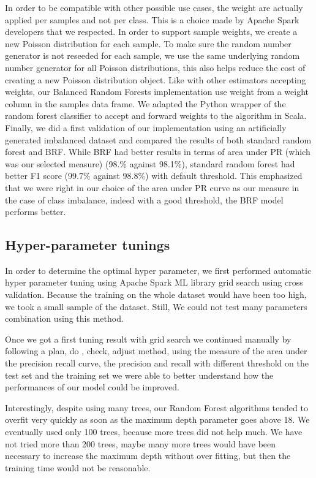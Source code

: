 \documentclass[conference]{IEEEtran}
\begin{document}
In order to be compatible with other possible use cases, the weight are actually applied per samples and not per class. This is a choice made by Apache Spark developers that we respected. In order to support sample weights, we create a new Poisson distribution for each sample. To make sure the random number generator is not reseeded for each sample, we use the same underlying random number generator for all Poisson distributions, this also helps reduce the cost of creating a new Poisson distribution object.
Like with other estimators accepting weights, our Balanced Random Forests implementation use weight from a weight column in the samples data frame. We adapted the Python wrapper of the random forest classifier to accept and forward weights to the algorithm in Scala. Finally, we did a first validation of our implementation using an artificially generated imbalanced dataset and compared the results of both standard random forest and BRF. While BRF had better results in terms of area under PR (which was our selected measure) (98.\% against 98.1\%), standard random forest had better F1 score (99.7\% against 98.8\%) with default threshold. This emphasized that we were right in our choice of the area under PR curve as our measure in the case of class imbalance, indeed with a good threshold, the BRF model performs better. 

\subsection{Hyper-parameter tunings}
In order to determine the optimal hyper parameter, we first performed automatic hyper parameter tuning using Apache Spark ML library grid search using cross validation. Because the training on the whole dataset would have been too high, we took a small sample of the dataset. Still, We could not test many parameters combination using this method.

Once we got a first tuning result with grid search we continued manually by following a plan, do , check, adjust method, using the measure of the area under the precision recall curve, the precision and recall with different threshold on the test set and the training set we were able to better understand how the performances of our model could be improved.

Interestingly, despite using many trees, our Random Forest algorithms tended to overfit very quickly as soon as the maximum depth parameter goes above 18. We eventually used only 100 trees, because more trees did not help much. We have not tried more than 200 trees, maybe many more trees would have been necessary to increase the maximum depth without over fitting, but then the training time would not be reasonable.
\end{document}
